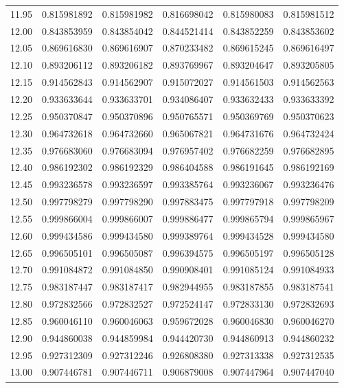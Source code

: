 \documentclass[11pt,a4paper]{article}
\begin{document}
\begin{longtable}{rrrrrr}
11.95 & 0.815981892 & 0.815981982 & 0.816698042 & 0.815980083 & 0.815981512 \\
12.00 & 0.843853959 & 0.843854042 & 0.844521414 & 0.843852259 & 0.843853602 \\
12.05 & 0.869616830 & 0.869616907 & 0.870233482 & 0.869615245 & 0.869616497 \\
12.10 & 0.893206112 & 0.893206182 & 0.893769967 & 0.893204647 & 0.893205805 \\
12.15 & 0.914562843 & 0.914562907 & 0.915072027 & 0.914561503 & 0.914562563 \\
12.20 & 0.933633644 & 0.933633701 & 0.934086407 & 0.933632433 & 0.933633392 \\
12.25 & 0.950370847 & 0.950370896 & 0.950765571 & 0.950369769 & 0.950370623 \\
12.30 & 0.964732618 & 0.964732660 & 0.965067821 & 0.964731676 & 0.964732424 \\
12.35 & 0.976683060 & 0.976683094 & 0.976957402 & 0.976682259 & 0.976682895 \\
12.40 & 0.986192302 & 0.986192329 & 0.986404588 & 0.986191645 & 0.986192169 \\
12.45 & 0.993236578 & 0.993236597 & 0.993385764 & 0.993236067 & 0.993236476 \\
12.50 & 0.997798279 & 0.997798290 & 0.997883475 & 0.997797918 & 0.997798209 \\
12.55 & 0.999866004 & 0.999866007 & 0.999886477 & 0.999865794 & 0.999865967 \\
12.60 & 0.999434586 & 0.999434580 & 0.999389764 & 0.999434528 & 0.999434580 \\
12.65 & 0.996505101 & 0.996505087 & 0.996394575 & 0.996505197 & 0.996505128 \\
12.70 & 0.991084872 & 0.991084850 & 0.990908401 & 0.991085124 & 0.991084933 \\
12.75 & 0.983187447 & 0.983187417 & 0.982944955 & 0.983187855 & 0.983187541 \\
12.80 & 0.972832566 & 0.972832527 & 0.972524147 & 0.972833130 & 0.972832693 \\
12.85 & 0.960046110 & 0.960046063 & 0.959672028 & 0.960046830 & 0.960046270 \\
12.90 & 0.944860038 & 0.944859984 & 0.944420730 & 0.944860913 & 0.944860232 \\
12.95 & 0.927312309 & 0.927312246 & 0.926808380 & 0.927313338 & 0.927312535 \\
13.00 & 0.907446781 & 0.907446711 & 0.906879008 & 0.907447964 & 0.907447040 \\

\end{longtable}
\end{document}
